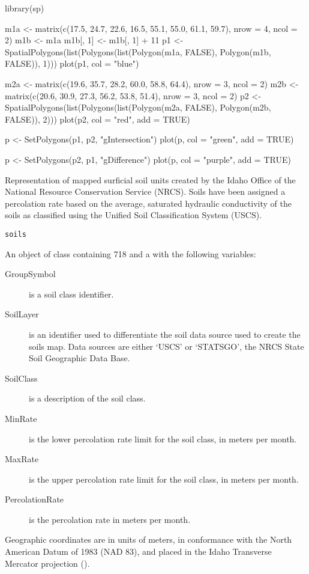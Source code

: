 \documentclass[letterpaper]{book}
\begin{document}
%
\begin{Examples}
\begin{ExampleCode}
library(sp)

m1a <- matrix(c(17.5, 24.7, 22.6, 16.5, 55.1, 55.0, 61.1, 59.7), nrow = 4, ncol = 2)
m1b <- m1a
m1b[, 1] <- m1b[, 1] + 11
p1 <- SpatialPolygons(list(Polygons(list(Polygon(m1a, FALSE), Polygon(m1b, FALSE)), 1)))
plot(p1, col = "blue")

m2a <- matrix(c(19.6, 35.7, 28.2, 60.0, 58.8, 64.4), nrow = 3, ncol = 2)
m2b <- matrix(c(20.6, 30.9, 27.3, 56.2, 53.8, 51.4), nrow = 3, ncol = 2)
p2 <- SpatialPolygons(list(Polygons(list(Polygon(m2a, FALSE), Polygon(m2b, FALSE)), 2)))
plot(p2, col = "red", add = TRUE)

p <- SetPolygons(p1, p2, "gIntersection")
plot(p, col = "green", add = TRUE)

p <- SetPolygons(p2, p1, "gDifference")
plot(p, col = "purple", add = TRUE)
\end{ExampleCode}
\end{Examples}
%
\begin{Description}\relax
Representation of mapped surficial soil units created by the Idaho Office of the National Resource Conservation Service (NRCS).
Soils have been assigned a percolation rate based on the average, saturated hydraulic conductivity of the soils as classified using the Unified Soil Classification System (USCS).
\end{Description}
%
\begin{Usage}
\begin{verbatim}
soils
\end{verbatim}
\end{Usage}
%
\begin{Format}
An object of  class containing 718  and a  with the following variables:
\begin{description}

\item[GroupSymbol] is a soil class identifier.
\item[SoilLayer] is an identifier used to differentiate the soil data source used to create the soils map.
Data sources are either `USCS' or `STATSGO', the NRCS State Soil Geographic Data Base.
\item[SoilClass] is a description of the soil class.
\item[MinRate] is the lower percolation rate limit for the soil class, in meters per month.
\item[MaxRate] is the upper percolation rate limit for the soil class, in meters per month.
\item[PercolationRate] is the percolation rate in meters per month.

\end{description}

Geographic coordinates are in units of meters, in conformance with the North American Datum of 1983 (NAD 83), and placed in the
Idaho Transverse Mercator projection ().
\end{Format}
\end{document}
